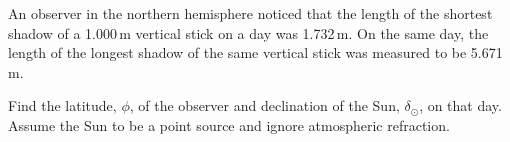 An observer in the northern hemisphere noticed that the length of the shortest
shadow of a 1.000\,m vertical stick on a day was 1.732\,m. On the same day,
the length of the longest shadow of the same vertical stick was measured to be
5.671\,m.

Find the latitude, $\phi$, of the observer and declination of the Sun,
$\delta_\odot$, on that day. Assume the Sun to be a point source and ignore
atmospheric refraction.
